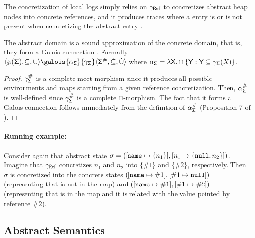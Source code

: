 The concretization of local logs simply relies on $\gamma_{\mathsf{Ref}}$ to concretizes abstract heap nodes into concrete references, and it produces traces where a  entry is or is not present when concretizing the abstract entry .

\begin{lemma}
	The abstract domain is a sound approximation of the concrete domain, that is, they form a Galois connection \cite{CC77}. Formally, $\langle \wp(\state), \subseteq, \cup \rangle \galois{\alpha_\state}{\gamma_\state} \langle \astate, \dot{\subseteq}, \dot{\cup} \rangle$ where $\alpha_{\mathsf{\Sigma}} = \lambda \mathsf{X} . \cap \{\mathsf{Y} : \mathsf{Y} \subseteq \gamma_{\mathsf{\Sigma}}(X)\}$.
\end{lemma}
\begin{proof}

$\gamma_\astates$ is a complete meet-morphism since it produces all possible environments and maps starting from a given reference concretization. Then, $\alpha_\astates$ is well-defined since $\gamma_\astates$ is a complete $\cap$-morphism. The fact that it forms a Galois connection follows immediately from the definition of $\alpha_\astates$ (Proposition 7 of \cite{CC92}).
\end{proof}


\paragraph{Running example:} Consider again that abstract state $\sigma = ([\mathtt{name} \mapsto \{n_1\}], [n_1 \mapsto \{\mathtt{null}, n_2\}])$. Imagine that $\gamma_{\mathsf{Ref}}$ concretizes $n_1$ and $n_2$ into $\{\#1\}$ and $\{\#2\}$, respectively. Then $\sigma$ is concretized into the concrete states $([\mathtt{name} \mapsto \#1], [\#1 \mapsto \mathtt{null}])$ (representing that  is not in the map) and $([\mathtt{name} \mapsto \#1], [\#1 \mapsto \#2])$ (representing that  is in the map and it is related with the value pointed by reference $\#2$).



\subsection{Abstract Semantics}
\label{sect:abstractsemantics}

